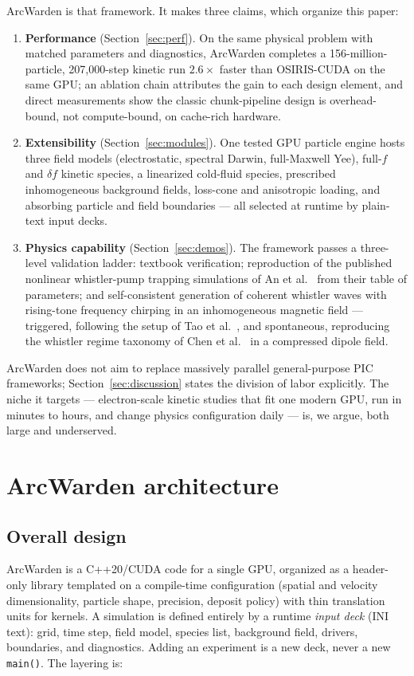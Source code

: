 \documentclass[11pt]{article}
\newcommand{\arcw}{ArcWarden}
\begin{document}
\arcw{} is that framework. It makes three claims, which organize this
paper:

\begin{enumerate}
\item \textbf{Performance} (Section~\ref{sec:perf}). On the same
  physical problem with matched parameters and diagnostics, \arcw{}
  completes a 156-million-particle,
  207{,}000-step kinetic run $2.6\times$ faster than OSIRIS-CUDA on the
  same GPU; an ablation chain attributes the gain to each design element,
  and direct measurements show the classic chunk-pipeline design is
  overhead-bound, not compute-bound, on cache-rich hardware.
\item \textbf{Extensibility} (Section~\ref{sec:modules}). One tested GPU
  particle engine hosts three field models (electrostatic, spectral
  Darwin, full-Maxwell Yee), full-$f$ and $\delta f$ kinetic species, a
  linearized cold-fluid species, prescribed inhomogeneous background
  fields, loss-cone and anisotropic loading, and absorbing particle and
  field boundaries --- all selected at runtime by plain-text input decks.
\item \textbf{Physics capability} (Section~\ref{sec:demos}). The
  framework passes a three-level validation ladder: textbook
  verification; reproduction of the published nonlinear whistler-pump
  trapping simulations of An et al.~\cite{an2019} from their table of
  parameters; and self-consistent generation of coherent whistler waves
  with rising-tone frequency chirping in an inhomogeneous magnetic
  field --- triggered, following the setup of Tao et al.~\cite{tao2017},
  and spontaneous, reproducing the whistler regime taxonomy of Chen et
  al.~\cite{chen2026} in a compressed dipole field.
\end{enumerate}

\arcw{} does not aim to replace massively parallel general-purpose PIC
frameworks; Section~\ref{sec:discussion} states the division of labor
explicitly. The niche it targets --- electron-scale kinetic studies that
fit one modern GPU, run in minutes to hours, and change physics
configuration daily --- is, we argue, both large and underserved.

\section{\arcw{} architecture}
\label{sec:arch}

\subsection{Overall design}
\label{sec:arch-overview}
\arcw{} is a C++20/CUDA code for a single GPU, organized as a
header-only library templated on a compile-time configuration (spatial
and velocity dimensionality, particle shape, precision, deposit policy)
with thin translation units for kernels. A simulation is defined
entirely by a runtime \emph{input deck} (INI text): grid, time step,
field model, species list, background field, drivers, boundaries, and
diagnostics. Adding an experiment is a new deck, never a new
\texttt{main()}. The layering is:
\end{document}
